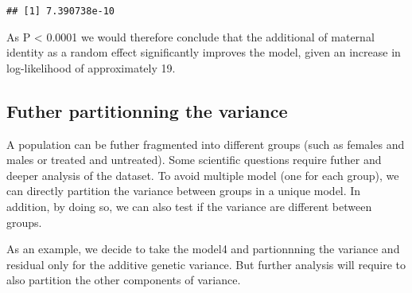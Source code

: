 \documentclass[
  12pt,
]{book}
\newenvironment{Shaded}{\begin{snugshade}}{\end{snugshade}}
\newcommand{\AttributeTok}[1]{\textcolor[rgb]{0.77,0.63,0.00}{#1}}
\newcommand{\DecValTok}[1]{\textcolor[rgb]{0.00,0.00,0.81}{#1}}
\newcommand{\FunctionTok}[1]{\textcolor[rgb]{0.00,0.00,0.00}{#1}}
\newcommand{\NormalTok}[1]{#1}
\newcommand{\OtherTok}[1]{\textcolor[rgb]{0.56,0.35,0.01}{#1}}
\newcommand{\SpecialCharTok}[1]{\textcolor[rgb]{0.00,0.00,0.00}{#1}}
\newcommand{\StringTok}[1]{\textcolor[rgb]{0.31,0.60,0.02}{#1}}
\begin{document}
\begin{verbatim}
## [1] 7.390738e-10
\end{verbatim}

As P \textless{} 0.0001 we would therefore conclude that the additional of maternal identity as a random effect significantly improves the model, given an increase in log-likelihood of approximately 19.

\hypertarget{futher-partitionning-the-variance}{%
\subsection{Futher partitionning the variance}\label{futher-partitionning-the-variance}}

A population can be futher fragmented into different groups (such as females and males or treated and untreated). Some scientific questions require futher and deeper analysis of the dataset. To avoid multiple model (one for each group), we can directly partition the variance between groups in a unique model. In addition, by doing so, we can also test if the variance are different between groups.

As an example, we decide to take the model4 and partionnning the variance and residual only for the additive genetic variance. But further analysis will require to also partition the other components of variance.

\begin{Shaded}
\end{Shaded}
\end{document}
